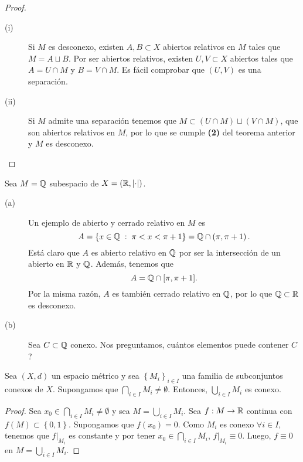 \begin{proof}
\begin{description}
\item[(i)] Si $\displaystyle M $ es desconexo, existen $\displaystyle A,B \subset X $ abiertos relativos en $\displaystyle M $ tales que $\displaystyle M = A \sqcup B$. Por ser abiertos relativos, existen $\displaystyle U,V \subset X $ abiertos tales que $\displaystyle A = U \cap M $ y $\displaystyle B = V \cap M $. Es fácil comprobar que $\displaystyle \left(U,V\right) $ es una separación.
\item[(ii)] Si $\displaystyle M $ admite una separación tenemos que $\displaystyle M \subset \left(U \cap M\right) \sqcup \left(V \cap M\right)$, que son abiertos relativos en $\displaystyle M $, por lo que se cumple \textbf{(2)} del teorema anterior y $\displaystyle M $ es desconexo.
\end{description}
\end{proof}
\begin{eg}
Sea $\displaystyle M = \mathbb{Q} $ subespacio de $\displaystyle X = \left(\mathbb{R}, \left| \cdot\right|\right) $. 
\begin{description}
\item[(a)] Un ejemplo de abierto y cerrado relativo en $\displaystyle M $ es
	\[A = \left\{ x \in \mathbb{Q} \; : \; \pi < x < \pi+1\right\}  = \mathbb{Q} \cap \left(\pi , \pi + 1\right) .\]
Está claro que $\displaystyle A $ es abierto relativo en $\displaystyle \mathbb{Q} $ por ser la intersección de un abierto en $\displaystyle \mathbb{R} $ y $\displaystyle \mathbb{Q} $. Además, tenemos que
\[A = \mathbb{Q} \cap [\pi , \pi + 1] .\]
Por la misma razón, $\displaystyle A $ es también cerrado relativo en $\displaystyle \mathbb{Q} $, por lo que $\displaystyle \mathbb{Q} \subset \mathbb{R} $ es desconexo. 
\item[(b)] Sea $\displaystyle C \subset\mathbb{Q} $ conexo. Nos preguntamos, cuántos elementos puede contener $\displaystyle C $? 
\end{description}
\end{eg}
\begin{lema}
	Sea $\displaystyle \left(X,d\right) $ un espacio métrico y sea $\displaystyle \left\{ M_{i}\right\} _{i\in I} $ una familia de subconjuntos conexos de $\displaystyle X $. Supongamos que $\displaystyle \bigcap_{i \in I}M_{i} \neq \emptyset $. Entonces, $\displaystyle \bigcup_{i \in I}M_{i} $ es conexo.
\end{lema}
\begin{proof}
	Sea $\displaystyle x_{0} \in \bigcap_{i \in I}M_{i} \neq \emptyset $ y sea $\displaystyle M = \bigcup_{i \in I}M_{i}$. Sea $\displaystyle f : M \to \mathbb{R} $ continua con $\displaystyle f\left(M\right) \subset \left\{ 0,1\right\}  $. Supongamos que $\displaystyle f\left(x_{0}\right) = 0 $. Como $\displaystyle M_{i} $ es conexo $\displaystyle \forall i  \in I $, tenemos que $\displaystyle f|_{M_{i}} $ es constante y por tener $\displaystyle x_{0} \in \bigcap_{i \in I}M_{i} $, $\displaystyle f|_{M_{i}} \equiv 0 $.
	Luego, $\displaystyle f \equiv 0 $ en $\displaystyle M = \bigcup_{i \in I}M_{i} $.
\end{proof}
